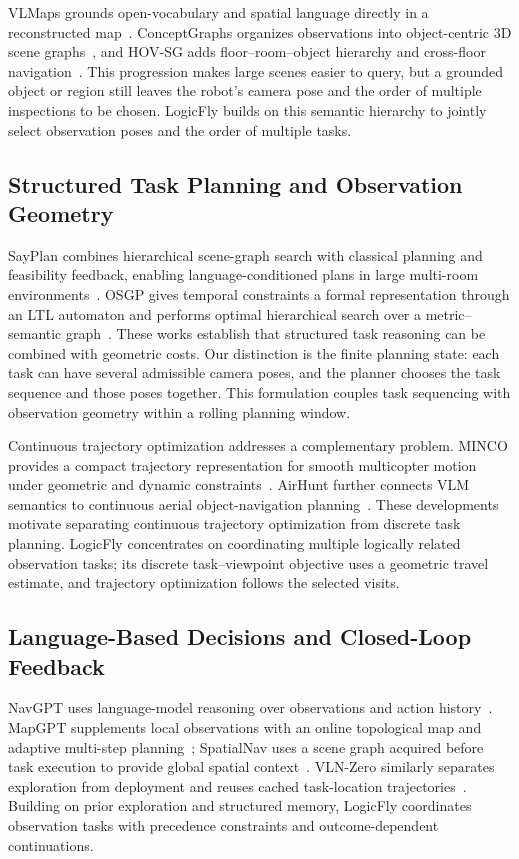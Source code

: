 \documentclass[letterpaper,10pt,journal]{IEEEtran}
\begin{document}
VLMaps grounds open-vocabulary and spatial language directly in a reconstructed map~\cite{huang2023vlmaps}. ConceptGraphs organizes observations into object-centric 3D scene graphs~\cite{gu2024conceptgraphs}, and HOV-SG adds floor--room--object hierarchy and cross-floor navigation~\cite{werby2024hovsg}. This progression makes large scenes easier to query, but a grounded object or region still leaves the robot's camera pose and the order of multiple inspections to be chosen. LogicFly builds on this semantic hierarchy to jointly select observation poses and the order of multiple tasks.

\subsection{Structured Task Planning and Observation Geometry}
SayPlan combines hierarchical scene-graph search with classical planning and feasibility feedback, enabling language-conditioned plans in large multi-room environments~\cite{rana2023sayplan}. OSGP gives temporal constraints a formal representation through an LTL automaton and performs optimal hierarchical search over a metric--semantic graph~\cite{dai2024osgp}. These works establish that structured task reasoning can be combined with geometric costs. Our distinction is the finite planning state: each task can have several admissible camera poses, and the planner chooses the task sequence and those poses together. This formulation couples task sequencing with observation geometry within a rolling planning window.

Continuous trajectory optimization addresses a complementary problem. MINCO provides a compact trajectory representation for smooth multicopter motion under geometric and dynamic constraints~\cite{wang2022minco}. AirHunt further connects VLM semantics to continuous aerial object-navigation planning~\cite{chen2026airhunt}. These developments motivate separating continuous trajectory optimization from discrete task planning. LogicFly concentrates on coordinating multiple logically related observation tasks; its discrete task--viewpoint objective uses a geometric travel estimate, and trajectory optimization follows the selected visits.

\subsection{Language-Based Decisions and Closed-Loop Feedback}
NavGPT uses language-model reasoning over observations and action history~\cite{zhou2024navgpt}. MapGPT supplements local observations with an online topological map and adaptive multi-step planning~\cite{chen2024mapgpt}; SpatialNav uses a scene graph acquired before task execution to provide global spatial context~\cite{zhang2026spatialnav}. VLN-Zero similarly separates exploration from deployment and reuses cached task-location trajectories~\cite{bhatt2025vlnzero}. Building on prior exploration and structured memory, LogicFly coordinates observation tasks with precedence constraints and outcome-dependent continuations.
\end{document}
